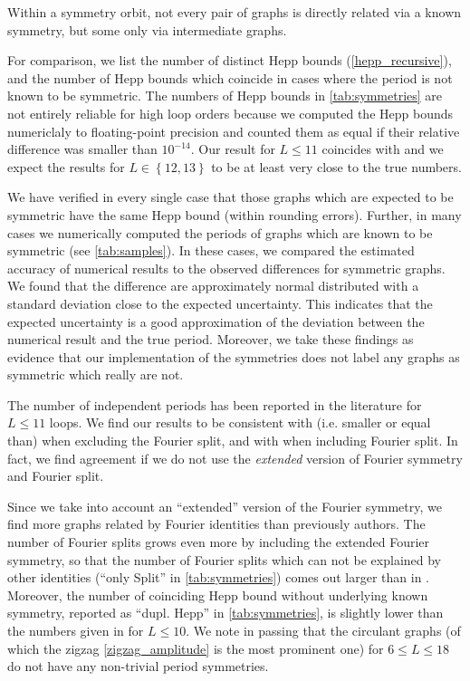 \documentclass[11pt,a4paper]{article}
\renewcommand{\|}{\rule[-0.4ex]{0.2ex}{1.2em}}
\begin{document}
Within a symmetry orbit, not every pair of graphs is directly related via a known symmetry, but some only via intermediate graphs. 


For comparison, we list the number of distinct Hepp bounds (\cref{hepp_recursive}), and the number of Hepp bounds which coincide in cases where the period is not known to be symmetric.
The numbers of Hepp bounds in \cref{tab:symmetries} are not entirely reliable for high loop orders because we computed the Hepp bounds numericlaly to floating-point precision and counted them as equal if their relative difference was smaller than $10^{-14}$. Our result for $L\leq 11$ coincides with \cite{panzer_hepp_2022} and we expect the results for $L\in \left \lbrace 12,13 \right \rbrace $ to be at least very close to the true numbers.


We have verified in every single case that those graphs which are expected to be symmetric have the same Hepp bound (within rounding errors). Further, in many cases we numerically computed the periods of graphs which are known to be symmetric (see \cref{tab:samples}). In these cases, we compared the estimated accuracy of numerical results to the observed differences for symmetric graphs. We found that the difference are approximately normal distributed with a standard deviation close to the expected uncertainty. This indicates that the expected uncertainty is a good approximation of the deviation between the numerical result and the true period. Moreover, we take these findings as evidence that our implementation of the symmetries does not label any graphs as symmetric which really are not. 

The number of independent periods has been reported in the literature for $L\leq 11$ loops. We find our results to be  consistent  with  (i.e. smaller or equal than)   \cite{schnetz_quantum_2010} when excluding the Fourier split, and  with \cite{hu_further_2022} when including Fourier split. In fact, we find agreement if we do not use the \emph{extended} version of Fourier symmetry and Fourier split.

Since we take into account an \enquote{extended} version of the Fourier symmetry, we find more graphs related by Fourier identities than previously authors. The number of Fourier splits grows even more by including the extended Fourier symmetry, so that the number of Fourier splits which can not be explained by other identities  (\enquote{only Split} in \cref{tab:symmetries}) comes out larger than in \cite{hu_further_2022}.
Moreover, the number of coinciding Hepp bound without underlying known symmetry, reported as \enquote{dupl. Hepp} in \cref{tab:symmetries}, is slightly lower than the numbers given in \cite[Table 3]{panzer_hepp_2022} for $L\leq 10$. We note in passing that the circulant graphs (of which the zigzag \cref{zigzag_amplitude} is the most prominent one) for $6 \leq L \leq 18$ do not have any non-trivial period symmetries.
\end{document}
